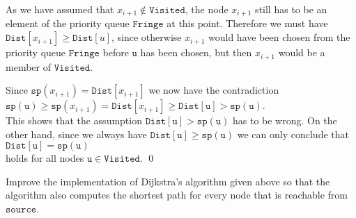 \begin{enumerate}
      As we have assumed that $x_{i+1} \not\in \mathtt{Visited}$, the node $x_{i+1}$ still has to be an
      element of the priority queue $\mathtt{Fringe}$ at this point.  Therefore we must have
      $\mathtt{Dist}[x_{i+1}] \geq \mathtt{Dist}[u]$, since otherwise  $x_{i+1}$ would have been
      chosen from the priority queue $\mathtt{Fringe}$ before $\mathtt{u}$ has been chosen, but then $x_{i+1}$
      would be a member of $\mathtt{Visited}$.

      Since $\mathtt{sp}(x_{i+1}) = \mathtt{Dist}[x_{i+1}]$ we now have the contradiction
      \\[0.2cm]
      \hspace*{1.3cm} 
      $\mathtt{sp(u)} \geq \mathtt{sp}(x_{i+1}) = \mathtt{Dist}[x_{i+1}] \geq \mathtt{Dist[u]} > \mathtt{sp(u)}$.
      \\[0.2cm]
      This shows that the assumption $\mathtt{Dist[u]} > \mathtt{sp(u)}$ has to be wrong.  On the
      other hand, since we always have $\mathtt{Dist[u]} \geq \mathtt{sp(u)}$ we can only conclude that
      \\[0.2cm]
      \hspace*{1.3cm}
      $\mathtt{Dist[u]} = \mathtt{sp(u)}$
      \\[0.2cm]
      holds for all nodes $\mathtt{u} \in \mathtt{Visited}$. \qed
\end{enumerate}

\exercise
Improve the implementation of Dijkstra's algorithm given above so that the algorithm also computes
the shortest path for every node that is reachable from $\mathtt{source}$.
\eox


